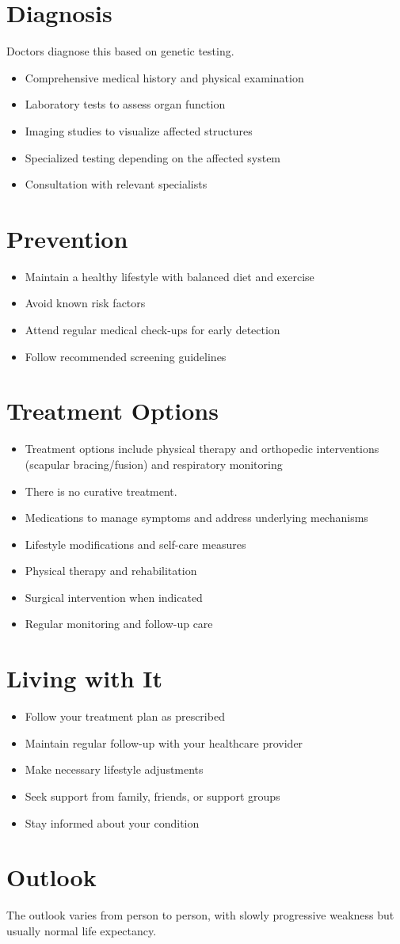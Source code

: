 \section{Diagnosis}
Doctors diagnose this based on genetic testing.

\begin{itemize}[noitemsep]
  \item Comprehensive medical history and physical examination
  \item Laboratory tests to assess organ function
  \item Imaging studies to visualize affected structures
  \item Specialized testing depending on the affected system
  \item Consultation with relevant specialists
\end{itemize}
\section{Prevention}
\begin{itemize}[noitemsep]
  \item Maintain a healthy lifestyle with balanced diet and exercise
  \item Avoid known risk factors
  \item Attend regular medical check-ups for early detection
  \item Follow recommended screening guidelines
\end{itemize}
\section{Treatment Options}
\begin{itemize}[noitemsep]
  \item Treatment options include physical therapy and orthopedic interventions (scapular bracing/fusion) and respiratory monitoring
  \item There is no curative treatment.
  \item Medications to manage symptoms and address underlying mechanisms
  \item Lifestyle modifications and self-care measures
  \item Physical therapy and rehabilitation
  \item Surgical intervention when indicated
  \item Regular monitoring and follow-up care
\end{itemize}
\section{Living with It}
\begin{itemize}[noitemsep]
  \item Follow your treatment plan as prescribed
  \item Maintain regular follow-up with your healthcare provider
  \item Make necessary lifestyle adjustments
  \item Seek support from family, friends, or support groups
  \item Stay informed about your condition
\end{itemize}
\section{Outlook}
The outlook varies from person to person, with slowly progressive weakness but usually normal life expectancy.
